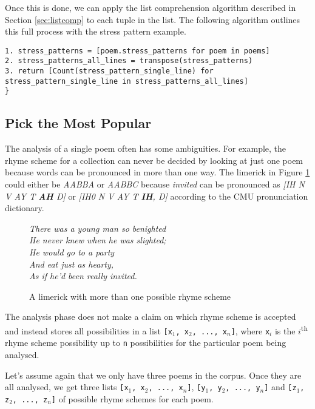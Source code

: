 Once this is done, we can apply the list comprehension algorithm described in Section \ref{sec:listcomp} to each tuple in the list. The following algorithm outlines this full process with the stress pattern example.

\begin{verbatim}
1. stress_patterns = [poem.stress_patterns for poem in poems]
2. stress_patterns_all_lines = transpose(stress_patterns)
3. return [Count(stress_pattern_single_line) for stress_pattern_single_line in stress_patterns_all_lines]
}
\end{verbatim}

\subsection{Pick the Most Popular}

The analysis of a single poem often has some ambiguities. For example, the rhyme scheme for a collection can never be decided by looking at just one poem because words can be pronounced in more than one way. The limerick in Figure \ref{fig:ambiguous-rhyme} could either be \textit{AABBA} or \textit{AABBC} because \textit{invited} can be pronounced as \textit{[IH N V AY T \textbf{AH} D]} or \textit{[IH0 N V AY T \textbf{IH}, D]} according to the CMU pronunciation dictionary.

\begin{figure}[h!]
\centering
\textit{
There was a young man so benighted\\
He never knew when he was slighted;\\
He would go to a party\\
And eat just as hearty,\\
As if he'd been really invited.\\
}
\caption{A limerick with more than one possible rhyme scheme}
\label{fig:ambiguous-rhyme}
\end{figure}

The analysis phase does not make a claim on which rhyme scheme is accepted and instead stores all possibilities in a list \texttt{[x$_1$, x$_2$, ..., x$_n$]}, where \texttt{x$_i$} is the $i$\textsuperscript{th} rhyme scheme possibility up to \texttt{n} possibilities for the particular poem being analysed.

Let's assume again that we only have three poems in the corpus. Once they are all analysed, we get three lists \texttt{[x$_1$, x$_2$, ..., x$_n$]}, \texttt{[y$_1$, y$_2$, ..., y$_n$]} and \texttt{[z$_1$, z$_2$, ..., z$_n$]} of possible rhyme schemes for each poem.

